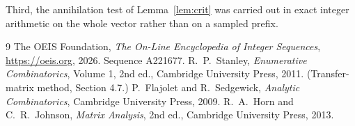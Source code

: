 \documentclass[11pt,a4paper]{article}
\theoremstyle{plain}
\theoremstyle{definition}
\begin{document}
Third, the annihilation test of Lemma~\ref{lem:crit} was carried out in exact integer
arithmetic on the whole vector rather than on a sampled prefix.

\begin{thebibliography}{9}
 The OEIS Foundation, \emph{The On-Line Encyclopedia of Integer
Sequences}, \url{https://oeis.org}, 2026. Sequence A221677.
 R.~P.~Stanley, \emph{Enumerative Combinatorics}, Volume 1, 2nd ed.,
Cambridge University Press, 2011. (Transfer-matrix method, Section 4.7.)
 P.~Flajolet and R.~Sedgewick, \emph{Analytic Combinatorics}, Cambridge
University Press, 2009.
 R.~A.~Horn and C.~R.~Johnson, \emph{Matrix Analysis}, 2nd ed., Cambridge
University Press, 2013.
\end{thebibliography}
\end{document}
